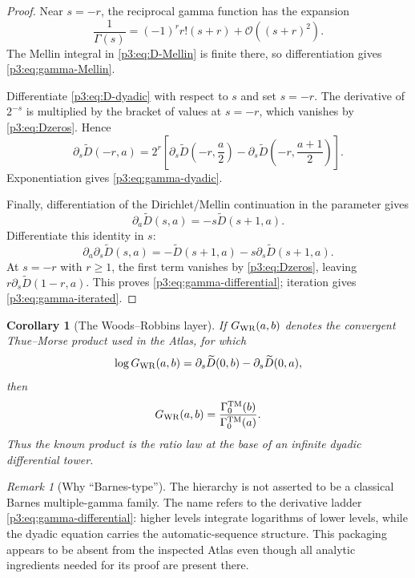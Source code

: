 \documentclass[11pt,oneside]{article}
\numberwithin{equation}{section}
\newtheorem{corollary}[theorem]{Corollary}
\theoremstyle{definition}
\theoremstyle{remark}
\newtheorem{remark}[theorem]{Remark}
\newcommand{\bigO}{\mathcal O}
\begin{document}
\begin{proof}
Near $s=-r$, the reciprocal gamma function has the expansion
\[
 \frac1{\Gamma(s)}=(-1)^rr!(s+r)+\bigO((s+r)^2).
\]
The Mellin integral in \eqref{p3:eq:D-Mellin} is finite there, so differentiation gives
\eqref{p3:eq:gamma-Mellin}.

Differentiate \eqref{p3:eq:D-dyadic} with respect to $s$ and set $s=-r$.  The derivative of
$2^{-s}$ is multiplied by the bracket of values at $s=-r$, which vanishes by
\eqref{p3:eq:Dzeros}.  Hence
\[
 \partial_s\widetilde D(-r,a)
 =2^r\left[
 \partial_s\widetilde D\!\left(-r,\frac a2\right)
 -\partial_s\widetilde D\!\left(-r,\frac{a+1}{2}\right)
 \right].
\]
Exponentiation gives \eqref{p3:eq:gamma-dyadic}.

Finally, differentiation of the Dirichlet/Mellin continuation in the parameter gives
\[
 \partial_a\widetilde D(s,a)=-s\widetilde D(s+1,a).
\]
Differentiate this identity in $s$:
\[
 \partial_a\partial_s\widetilde D(s,a)
 =-\widetilde D(s+1,a)-s\partial_s\widetilde D(s+1,a).
\]
At $s=-r$ with $r\ge1$, the first term vanishes by \eqref{p3:eq:Dzeros}, leaving
$r\partial_s\widetilde D(1-r,a)$.  This proves \eqref{p3:eq:gamma-differential}; iteration gives
\eqref{p3:eq:gamma-iterated}.
\end{proof}

\begin{corollary}[The Woods--Robbins layer]
\label{p3:cor:Woods-Robbins}
If $G_{\rm WR}(a,b)$ denotes the convergent Thue--Morse product used in the Atlas, for which
\[
 \log G_{\rm WR}(a,b)=\partial_s\widetilde D(0,b)
 -\partial_s\widetilde D(0,a),
\]
then
\begin{equation}
 G_{\rm WR}(a,b)=\frac{\Gamma_0^{\rm TM}(b)}{\Gamma_0^{\rm TM}(a)}.
 \label{p3:eq:WR-gamma}
\end{equation}
Thus the known product is the ratio law at the base of an infinite dyadic differential
tower.
\end{corollary}

\begin{remark}[Why ``Barnes-type'']
The hierarchy is not asserted to be a classical Barnes multiple-gamma family.  The name refers
to the derivative ladder \eqref{p3:eq:gamma-differential}: higher levels integrate logarithms of
lower levels, while the dyadic equation carries the automatic-sequence structure.  This
packaging appears to be absent from the inspected Atlas even though all analytic ingredients
needed for its proof are present there.
\end{remark}
\end{document}

